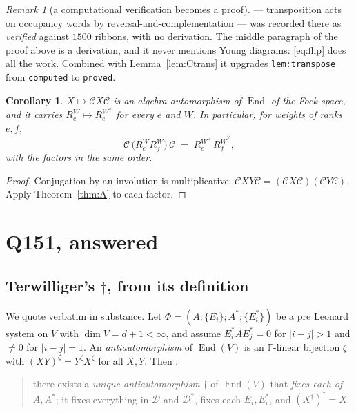 \documentclass[11pt]{article}
\newtheorem{corollary}[theorem]{Corollary}
\theoremstyle{definition}
\theoremstyle{remark}
\newtheorem{remark}[theorem]{Remark}
\newcommand{\F}{\mathbb{F}}
\newcommand{\Cop}{\mathcal{C}}
\newcommand{\End}{\operatorname{End}}
\begin{document}
\begin{remark}[a computational verification becomes a proof]
\cite[Lem.~\texttt{lem:transpose}]{Q149} --- transposition acts on occupancy words by
reversal-and-complementation --- was recorded there as \emph{verified} against $1500$
ribbons, with no derivation.  The middle paragraph of the proof above is a derivation, and
it never mentions Young diagrams: \eqref{eq:flip} does all the work.  Combined with
Lemma~\ref{lem:Ctrans} it upgrades \texttt{lem:transpose} from \texttt{computed} to
\texttt{proved}.
\end{remark}

\begin{corollary}\label{cor:aut}
$X\mapsto \Cop X\Cop$ is an algebra \emph{automorphism} of $\End$ of the Fock space, and it
carries $R_e^{W}\mapsto R_e^{W^\vee}$ for every $e$ and $W$.  In particular, for weights of
ranks $e,f$,
\[
   \Cop\,\bigl(R_e^{W}R_f^{\bar W}\bigr)\,\Cop \;=\; R_e^{W^\vee}\,R_f^{\bar W^\vee},
\]
with the factors in the \emph{same} order.
\end{corollary}

\begin{proof}
Conjugation by an involution is multiplicative: $\Cop XY\Cop=(\Cop X\Cop)(\Cop Y\Cop)$.
Apply Theorem~\ref{thm:A} to each factor.
\end{proof}

\section{Q151, answered}

\subsection{Terwilliger's $\dagger$, from its definition}

We quote \cite[\S4]{T2020} verbatim in substance.  Let $\Phi=(A;\{E_i\};A^*;\{E^*_i\})$ be
a pre Leonard system on $V$ with $\dim V=d+1<\infty$, and assume
$E^*_iAE^*_j=0$ for $|i-j|>1$ and $\ne0$ for $|i-j|=1$.  An \emph{antiautomorphism} of
$\End(V)$ is an $\F$-linear bijection $\zeta$ with $(XY)^\zeta=Y^\zeta X^\zeta$ for all
$X,Y$.  Then \cite[Lem.~\texttt{lem:antiaut}]{T2020}:
\begin{quote}
there exists a \emph{unique antiautomorphism} $\dagger$ of $\End(V)$ that \emph{fixes each
of $A,A^*$}; it fixes everything in $\mathcal D$ and $\mathcal D^*$, fixes each $E_i,E^*_i$,
and $(X^\dagger)^\dagger=X$.
\end{quote}
\end{document}

